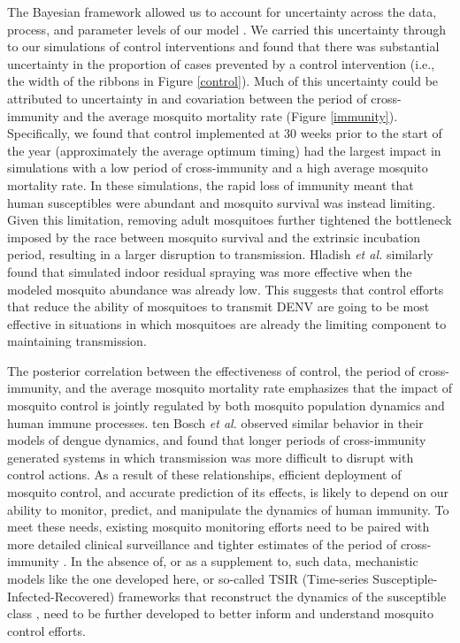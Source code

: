 \documentclass[10pt,letterpaper]{article}
\begin{document}
The Bayesian framework allowed us to account for uncertainty across the data, process, and parameter levels of our model \cite{Berliner1996}.
We carried this uncertainty through to our simulations of control interventions \cite{Elderd2006} and found that there was substantial uncertainty in the proportion of cases prevented by a control intervention (i.e., the width of the ribbons in Figure \ref{control}).
Much of this uncertainty could be attributed to uncertainty in and covariation between the period of cross-immunity and the average mosquito mortality rate (Figure \ref{immunity}).
Specifically, we found that control implemented at 30 weeks prior to the start of the year (approximately the average optimum timing) had the largest impact in simulations with a low period of cross-immunity and a high average mosquito mortality rate.
In these simulations, the rapid loss of immunity meant that human susceptibles were abundant and mosquito survival was instead limiting.
Given this limitation, removing adult mosquitoes further tightened the bottleneck imposed by the race between mosquito survival and the extrinsic incubation period, resulting in a larger disruption to transmission.
Hladish \emph{et al.} \cite{Hladish2018} similarly found that simulated indoor residual spraying was more effective when the modeled mosquito abundance was already low.
This suggests that control efforts that reduce the ability of mosquitoes to transmit DENV are going to be most effective in situations in which mosquitoes are already the limiting component to maintaining transmission.

The posterior correlation between the effectiveness of control, the period of cross-immunity, and the average mosquito mortality rate emphasizes that the impact of mosquito control is jointly regulated by both mosquito population dynamics and human immune processes.
ten Bosch \emph{et al.} \cite{TenBosch2016} observed similar behavior in their models of dengue dynamics, and found that longer periods of cross-immunity generated systems in which transmission was more difficult to disrupt with control actions.
As a result of these relationships, efficient deployment of mosquito control, and accurate prediction of its effects, is likely to depend on our ability to monitor, predict, and manipulate the dynamics of human immunity.
To meet these needs, existing mosquito monitoring efforts need to be paired with more detailed clinical surveillance \cite{Morrison2008} and tighter estimates of the period of cross-immunity \cite{TenBosch2016}.
In the absence of, or as a supplement to, such data, mechanistic models like the one developed here, or so-called TSIR (Time-series Susceptiple-Infected-Recovered) frameworks that reconstruct the dynamics of the susceptible class \cite{Finkenstadt2000, Reich2013}, need to be further developed to better inform and understand mosquito control efforts.
\end{document}
